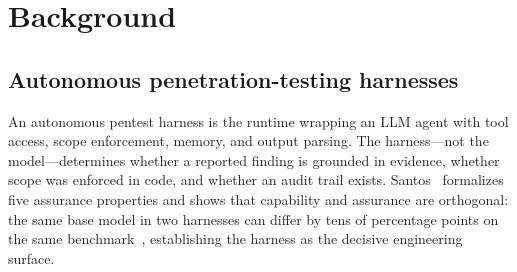 \documentclass[conference]{IEEEtran}
\begin{document}
\begin{table}[h]
\centering
\caption{Contribution status: what has been implemented, measured, or proposed.}
\label{tab:status}
\small
{}
\end{table}

\section{Background}\label{sec:background}

\subsection{Autonomous penetration-testing harnesses}

An autonomous pentest harness is the runtime wrapping an LLM agent with tool access, scope enforcement, memory, and output parsing. The harness---not the model---determines whether a reported finding is grounded in evidence, whether scope was enforced in code, and whether an audit trail exists. Santos~\cite{santos2026assurance} formalizes five assurance properties and shows that capability and assurance are orthogonal: the same base model in two harnesses can differ by tens of percentage points on the same benchmark~\cite{cybench2024,wang2025checkmate}, establishing the harness as the decisive engineering surface.
\end{document}
